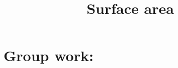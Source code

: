 \documentclass[]{ximera}
\title{Surface area}
\begin{document}
\begin{abstract}		\end{abstract}
\maketitle


\begin{comment}
\section{Warm up:}

	\begin{freeResponse}
	
	\end{freeResponse}
	
\begin{instructorNotes}

\end{instructorNotes}
\end{comment}







\section{Group work:}
\end{document}
